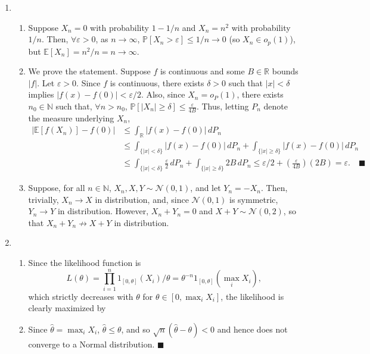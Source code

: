 \documentclass[11pt]{article}
\renewcommand{\qed}{\quad \ensuremath{\blacksquare}}
\newcommand{\E}{\mathbb{E}} %
\newcommand{\pr}{\mathbb{P}} %
\newcommand{\N}{\mathbb{N}} %
\newcommand{\R}{\mathbb{R}} %
\newcommand{\e}{\varepsilon} %
\begin{document}
\begin{enumerate}
\begin{enumerate}
\end{enumerate}

\item
\begin{enumerate}
\item Suppose $X_n = 0$ with probability $1 - 1/n$ and $X_n = n^2$ with
probability $1/n$. Then, $\forall \e > 0$, as $n \to \infty$,
$\pr[X_n > \e] \leq 1/n \to 0$ (so $X_n \in o_p(1)$), but
$\E[X_n] = n^2/n = n \to \infty$.

\item We prove the statement. Suppose $f$ is continuous and some $B \in \R$
bounds $|f|$. Let $\e > 0$. Since $f$ is continuous, there exists $\delta > 0$
such that $|x| < \delta$ implies $|f(x) - f(0)| < \e/2$. Also, since
$X_n = o_P(1)$, there exists $n_0 \in \N$ such that, $\forall n > n_0$,
$\pr[|X_n| \geq \delta] \leq \frac{\e}{4B}$. Thus, letting $P_n$ denote the
measure underlying $X_n$,
\begin{align*}
|\E[f(X_n)] - f(0)|
 &  \leq \int_\R |f(x) - f(0)| \, dP_n  \\
 &  \leq \int_{\{|x| < \delta\}} |f(x) - f(0)| \, dP_n
    + \int_{\{|x| \geq \delta\}} |f(x) - f(0)| \, dP_n \\
 &  \leq \int_{\{|x| < \delta\}} \frac{\e}{2} \, dP_n
    + \int_{\{|x| \geq \delta\}} 2B \, dP_n
    \leq \e/2 + \left( \frac{\e}{4B} \right) (2B)
    = \e. \qed
\end{align*}

\item Suppose, for all $n \in \N$, $X_n, X, Y \sim \mathcal{N}(0,1)$, and let
$Y_n = -X_n$. Then, trivially, $X_n \to X$ in distribution, and, since
$\mathcal{N}(0,1)$ is symmetric, $Y_n \to Y$ in distribution. However,
$X_n + Y_n = 0$ and $X + Y \sim \mathcal{N}(0,2)$, so that
$X_n + Y_n \not\to X + Y$ in distribution.
\end{enumerate}

\item
\begin{enumerate}
\item Since the likelihood function is
\[L(\theta)
    = \prod_{i = 1}^n 1_{[0,\theta]}(X_i)/\theta
    = \theta^{-n} 1_{[0,\theta]}(\max_i X_i),
\]
which strictly decreases with $\theta$ for $\theta \in [0,\max_i X_i]$,
the likelihood is clearly maximized by 

\item Since $\hat\theta = \max_i X_i$, $\hat\theta \leq \theta$, and so
$\sqrt{n}(\hat\theta - \theta) < 0$ and hence does not converge to a Normal
distribution. \qed
\end{enumerate}


\end{enumerate}
\end{document}
